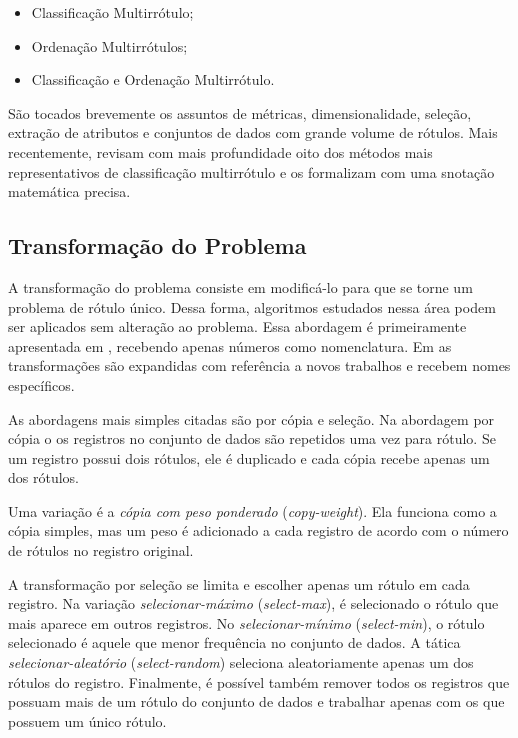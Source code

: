 \documentclass[runningheads,a4paper]{llncs}
\begin{document}
\begin{itemize}
\item Classificação Multirrótulo;
\item Ordenação Multirrótulos;
\item Classificação e Ordenação Multirrótulo.
\end{itemize}

São tocados brevemente os assuntos de métricas, dimensionalidade, seleção, extração de atributos e conjuntos de dados com grande volume de rótulos. 
Mais recentemente, \cite{Zhang2014-be} revisam com mais profundidade oito dos métodos mais representativos de classificação multirrótulo e os formalizam com uma snotação matemática precisa.

\subsection{Transformação do Problema}\label{subsec:transformacao}

A transformação do problema consiste em modificá-lo para que se torne um problema de rótulo único. Dessa forma, algoritmos estudados nessa área podem ser aplicados sem alteração ao problema. Essa abordagem é primeiramente apresentada em \cite{Tsoumakas2007-cw}, recebendo apenas números como nomenclatura. Em \cite{Tsoumakas2009-vw} as transformações são expandidas com referência a novos trabalhos e recebem nomes específicos.

As abordagens mais simples citadas são por cópia e seleção. Na abordagem por cópia o os registros no conjunto de dados são repetidos uma vez para rótulo. Se um registro possui dois rótulos, ele é duplicado e cada cópia recebe apenas um dos rótulos.

Uma variação é a \emph{cópia com peso ponderado} (\textit{copy-weight}). Ela funciona como a cópia simples, mas um peso é adicionado a cada registro de acordo com o número de rótulos no registro original.

A transformação por seleção se limita e escolher apenas um rótulo em cada registro. Na variação \emph{selecionar-máximo} (\textit{select-max}), é selecionado o rótulo que mais aparece em outros registros. No \emph{selecionar-mínimo} (\textit{select-min}), o rótulo selecionado é aquele que menor frequência no conjunto de dados. A tática \emph{selecionar-aleatório} (\textit{select-random}) seleciona aleatoriamente apenas um dos rótulos do registro. Finalmente, é possível também remover todos os registros que possuam mais de um rótulo do conjunto de dados e trabalhar apenas com os que possuem um único rótulo.
\end{document}
